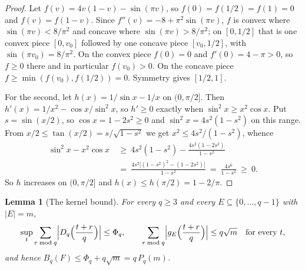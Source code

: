\documentclass[11pt]{amsart}
\newtheorem{lemma}[theorem]{Lemma}
\theoremstyle{definition}
\theoremstyle{remark}
\begin{document}
\begin{proof}
Let $f(v) = 4v(1-v) - \sin(\pi v)$, so $f(0) = f(1/2) = f(1) = 0$ and $f(v) = f(1-v)$. Since $f''(v) = -8 + \pi^2 \sin(\pi v)$, $f$ is convex where $\sin(\pi v) < 8/\pi^2$ and concave where $\sin(\pi v) > 8/\pi^2$; on $[0,1/2]$ that is one convex piece $[0, v_0]$ followed by one concave piece $[v_0, 1/2]$, with $\sin(\pi v_0) = 8/\pi^2$. On the convex piece $f(0) = 0$ and $f'(0) = 4 - \pi > 0$, so $f \ge 0$ there and in particular $f(v_0) > 0$. On the concave piece $f \ge \min(f(v_0), f(1/2)) = 0$. Symmetry gives $[1/2, 1]$.

For the second, let $h(x) = 1/\sin x - 1/x$ on $(0, \pi/2]$. Then $h'(x) = 1/x^2 - \cos x/\sin^2 x$, so $h' \ge 0$ exactly when $\sin^2 x \ge x^2 \cos x$. Put $s = \sin(x/2)$, so $\cos x = 1 - 2s^2 \ge 0$ and $\sin^2 x = 4s^2(1-s^2)$ on this range. From $x/2 \le \tan(x/2) = s/\sqrt{1-s^2}$ we get $x^2 \le 4s^2/(1-s^2)$, whence
\begin{align*}
  \sin^2 x - x^2 \cos x &\ \ge\ 4s^2(1-s^2) - \frac{4s^2(1-2s^2)}{1-s^2} \\
  &\ =\ \frac{4s^2\bigl[(1-s^2)^2 - (1-2s^2)\bigr]}{1-s^2} \ =\ \frac{4s^6}{1-s^2} \ \ge\ 0 .
\end{align*}
So $h$ increases on $(0,\pi/2]$ and $h(x) \le h(\pi/2) = 1 - 2/\pi$.
\end{proof}

\begin{lemma}[The kernel bound]
\label{lem:kernel}
For every $q \ge 3$ and every $E \subseteq \{0,\dots,q-1\}$ with $|E| = m$,
\[
  \sup_t \sum_{r \bmod q} \Bigl| D_q\Bigl(\frac{t+r}{q}\Bigr) \Bigr| \le \Phi_q,
  \qquad
  \sum_{r \bmod q} \Bigl| g_E\Bigl(\frac{t+r}{q}\Bigr) \Bigr| \le q \sqrt m \quad \text{for every } t,
\]
and hence $B_q(F) \le \Phi_q + q\sqrt m = q\, P_q(m)$.
\end{lemma}
\end{document}
